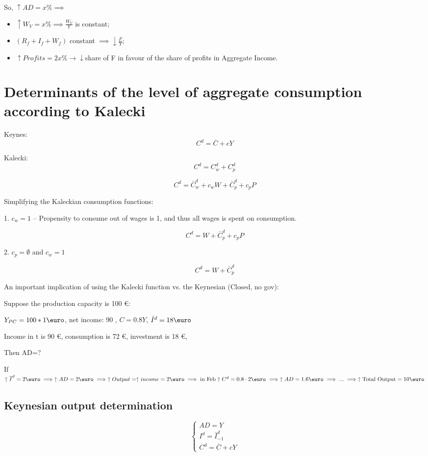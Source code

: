 \documentclass{report}
\begin{document}
So, $\uparrow AD=x\% \implies$
\begin{itemize}
    \item $\uparrow W_V=x\% \implies \frac{W_V}{Y}$ is constant; 
    \item $(R_f+I_f+W_f)$ constant $\implies \downarrow \frac{F}{Y}$;
    \item $\uparrow Profits=2x\% \rightarrow \downarrow$share of F in favour of the share of profits in Aggregate Income. 
\end{itemize}


\section{Determinants of the level of aggregate consumption according to Kalecki}

Keynes: 
$$C^d = \bar{C} + cY$$

Kalecki:
$$C^d = C^d_w + C^d_p$$


$$C^d = \bar{C}^d_w + c_w W + \bar{C}_p^d + c_p P$$

Simplifying the Kaleckian consumption functions: 

1. $c_w = 1$ – Propensity to consume out of wages is 1, and thus all wages is spent on consumption.

$$C^d = W + \bar{C}^d_p + c_p P$$

2. $c_p = \emptyset$ and $c_w = 1$

$$C^d = W + \bar{C}_p^d$$

An important implication of using the Kalecki function vs. the Keynesian (Closed, no gov):

Suppose the production capacity is 100 \euro:

$Y_{PC} = 100 * 1 \text{\euro}$, net income: 90 \text{\euro}, $C = 0.8Y$, $\bar{I}^d = 18 \text{\euro}$

Income in t is 90 \euro, consumption is 72 \euro, investment is 18 \euro, 

Then AD=?


If $\uparrow \overline{I}^d=2\text{\euro}\implies \uparrow AD=2\text{\euro} \implies \uparrow Output=\uparrow income=2\text{\euro} \implies \text{in Feb} \uparrow C^d=0.8\cdot2\text{\euro} \implies \uparrow AD=1.6\text{\euro} \implies ... \implies \uparrow \text{Total Output}=10\text{\euro}$

\subsection{Keynesian output determination}
\[ 
\left\{ \begin{array}{l} 
AD = Y \\
I^d = \bar{I}^d_{-1} \\
C^d = \bar{C} + cY
\end{array} \right.
\]
\end{document}
